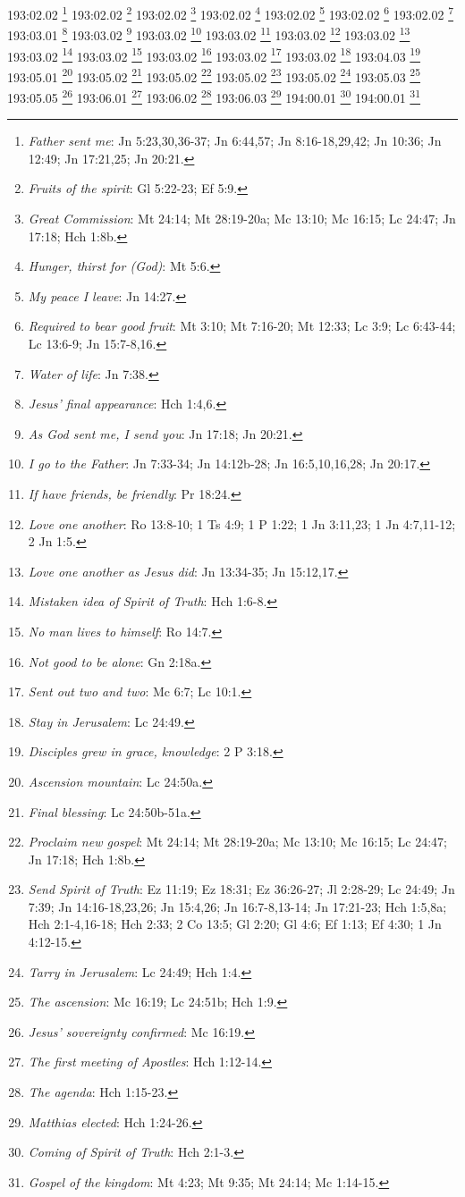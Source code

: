 193:02.02 \footnote{\textit{Father sent me}: Jn 5:23,30,36-37; Jn 6:44,57; Jn 8:16-18,29,42; Jn 10:36; Jn 12:49; Jn 17:21,25; Jn 20:21.}
193:02.02 \footnote{\textit{Fruits of the spirit}: Gl 5:22-23; Ef 5:9.}
193:02.02 \footnote{\textit{Great Commission}: Mt 24:14; Mt 28:19-20a; Mc 13:10; Mc 16:15; Lc 24:47; Jn 17:18; Hch 1:8b.}
193:02.02 \footnote{\textit{Hunger, thirst for (God)}: Mt 5:6.}
193:02.02 \footnote{\textit{My peace I leave}: Jn 14:27.}
193:02.02 \footnote{\textit{Required to bear good fruit}: Mt 3:10; Mt 7:16-20; Mt 12:33; Lc 3:9; Lc 6:43-44; Lc 13:6-9; Jn 15:7-8,16.}
193:02.02 \footnote{\textit{Water of life}: Jn 7:38.}
193:03.01 \footnote{\textit{Jesus' final appearance}: Hch 1:4,6.}
193:03.02 \footnote{\textit{As God sent me, I send you}: Jn 17:18; Jn 20:21.}
193:03.02 \footnote{\textit{I go to the Father}: Jn 7:33-34; Jn 14:12b-28; Jn 16:5,10,16,28; Jn 20:17.}
193:03.02 \footnote{\textit{If have friends, be friendly}: Pr 18:24.}
193:03.02 \footnote{\textit{Love one another}: Ro 13:8-10; 1 Ts 4:9; 1 P 1:22; 1 Jn 3:11,23; 1 Jn 4:7,11-12; 2 Jn 1:5.}
193:03.02 \footnote{\textit{Love one another as Jesus did}: Jn 13:34-35; Jn 15:12,17.}
193:03.02 \footnote{\textit{Mistaken idea of Spirit of Truth}: Hch 1:6-8.}
193:03.02 \footnote{\textit{No man lives to himself}: Ro 14:7.}
193:03.02 \footnote{\textit{Not good to be alone}: Gn 2:18a.}
193:03.02 \footnote{\textit{Sent out two and two}: Mc 6:7; Lc 10:1.}
193:03.02 \footnote{\textit{Stay in Jerusalem}: Lc 24:49.}
193:04.03 \footnote{\textit{Disciples grew in grace, knowledge}: 2 P 3:18.}
193:05.01 \footnote{\textit{Ascension mountain}: Lc 24:50a.}
193:05.02 \footnote{\textit{Final blessing}: Lc 24:50b-51a.}
193:05.02 \footnote{\textit{Proclaim new gospel}: Mt 24:14; Mt 28:19-20a; Mc 13:10; Mc 16:15; Lc 24:47; Jn 17:18; Hch 1:8b.}
193:05.02 \footnote{\textit{Send Spirit of Truth}: Ez 11:19; Ez 18:31; Ez 36:26-27; Jl 2:28-29; Lc 24:49; Jn 7:39; Jn 14:16-18,23,26; Jn 15:4,26; Jn 16:7-8,13-14; Jn 17:21-23; Hch 1:5,8a; Hch 2:1-4,16-18; Hch 2:33; 2 Co 13:5; Gl 2:20; Gl 4:6; Ef 1:13; Ef 4:30; 1 Jn 4:12-15.}
193:05.02 \footnote{\textit{Tarry in Jerusalem}: Lc 24:49; Hch 1:4.}
193:05.03 \footnote{\textit{The ascension}: Mc 16:19; Lc 24:51b; Hch 1:9.}
193:05.05 \footnote{\textit{Jesus' sovereignty confirmed}: Mc 16:19.}
193:06.01 \footnote{\textit{The first meeting of Apostles}: Hch 1:12-14.}
193:06.02 \footnote{\textit{The agenda}: Hch 1:15-23.}
193:06.03 \footnote{\textit{Matthias elected}: Hch 1:24-26.}
194:00.01 \footnote{\textit{Coming of Spirit of Truth}: Hch 2:1-3.}
194:00.01 \footnote{\textit{Gospel of the kingdom}: Mt 4:23; Mt 9:35; Mt 24:14; Mc 1:14-15.}
